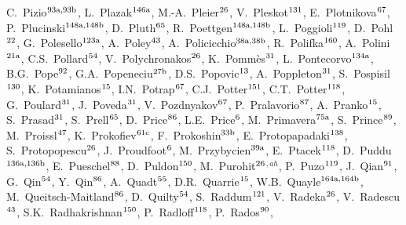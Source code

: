 \begin{flushleft}
C.~Pizio$^\textrm{\scriptsize 93a,93b}$,
L.~Plazak$^\textrm{\scriptsize 146a}$,
M.-A.~Pleier$^\textrm{\scriptsize 26}$,
V.~Pleskot$^\textrm{\scriptsize 131}$,
E.~Plotnikova$^\textrm{\scriptsize 67}$,
P.~Plucinski$^\textrm{\scriptsize 148a,148b}$,
D.~Pluth$^\textrm{\scriptsize 65}$,
R.~Poettgen$^\textrm{\scriptsize 148a,148b}$,
L.~Poggioli$^\textrm{\scriptsize 119}$,
D.~Pohl$^\textrm{\scriptsize 22}$,
G.~Polesello$^\textrm{\scriptsize 123a}$,
A.~Poley$^\textrm{\scriptsize 43}$,
A.~Policicchio$^\textrm{\scriptsize 38a,38b}$,
R.~Polifka$^\textrm{\scriptsize 160}$,
A.~Polini$^\textrm{\scriptsize 21a}$,
C.S.~Pollard$^\textrm{\scriptsize 54}$,
V.~Polychronakos$^\textrm{\scriptsize 26}$,
K.~Pomm\`es$^\textrm{\scriptsize 31}$,
L.~Pontecorvo$^\textrm{\scriptsize 134a}$,
B.G.~Pope$^\textrm{\scriptsize 92}$,
G.A.~Popeneciu$^\textrm{\scriptsize 27b}$,
D.S.~Popovic$^\textrm{\scriptsize 13}$,
A.~Poppleton$^\textrm{\scriptsize 31}$,
S.~Pospisil$^\textrm{\scriptsize 130}$,
K.~Potamianos$^\textrm{\scriptsize 15}$,
I.N.~Potrap$^\textrm{\scriptsize 67}$,
C.J.~Potter$^\textrm{\scriptsize 151}$,
C.T.~Potter$^\textrm{\scriptsize 118}$,
G.~Poulard$^\textrm{\scriptsize 31}$,
J.~Poveda$^\textrm{\scriptsize 31}$,
V.~Pozdnyakov$^\textrm{\scriptsize 67}$,
P.~Pralavorio$^\textrm{\scriptsize 87}$,
A.~Pranko$^\textrm{\scriptsize 15}$,
S.~Prasad$^\textrm{\scriptsize 31}$,
S.~Prell$^\textrm{\scriptsize 65}$,
D.~Price$^\textrm{\scriptsize 86}$,
L.E.~Price$^\textrm{\scriptsize 6}$,
M.~Primavera$^\textrm{\scriptsize 75a}$,
S.~Prince$^\textrm{\scriptsize 89}$,
M.~Proissl$^\textrm{\scriptsize 47}$,
K.~Prokofiev$^\textrm{\scriptsize 61c}$,
F.~Prokoshin$^\textrm{\scriptsize 33b}$,
E.~Protopapadaki$^\textrm{\scriptsize 138}$,
S.~Protopopescu$^\textrm{\scriptsize 26}$,
J.~Proudfoot$^\textrm{\scriptsize 6}$,
M.~Przybycien$^\textrm{\scriptsize 39a}$,
E.~Ptacek$^\textrm{\scriptsize 118}$,
D.~Puddu$^\textrm{\scriptsize 136a,136b}$,
E.~Pueschel$^\textrm{\scriptsize 88}$,
D.~Puldon$^\textrm{\scriptsize 150}$,
M.~Purohit$^\textrm{\scriptsize 26}$$^{,ah}$,
P.~Puzo$^\textrm{\scriptsize 119}$,
J.~Qian$^\textrm{\scriptsize 91}$,
G.~Qin$^\textrm{\scriptsize 54}$,
Y.~Qin$^\textrm{\scriptsize 86}$,
A.~Quadt$^\textrm{\scriptsize 55}$,
D.R.~Quarrie$^\textrm{\scriptsize 15}$,
W.B.~Quayle$^\textrm{\scriptsize 164a,164b}$,
M.~Queitsch-Maitland$^\textrm{\scriptsize 86}$,
D.~Quilty$^\textrm{\scriptsize 54}$,
S.~Raddum$^\textrm{\scriptsize 121}$,
V.~Radeka$^\textrm{\scriptsize 26}$,
V.~Radescu$^\textrm{\scriptsize 43}$,
S.K.~Radhakrishnan$^\textrm{\scriptsize 150}$,
P.~Radloff$^\textrm{\scriptsize 118}$,
P.~Rados$^\textrm{\scriptsize 90}$,
$$
\end{flushleft}
